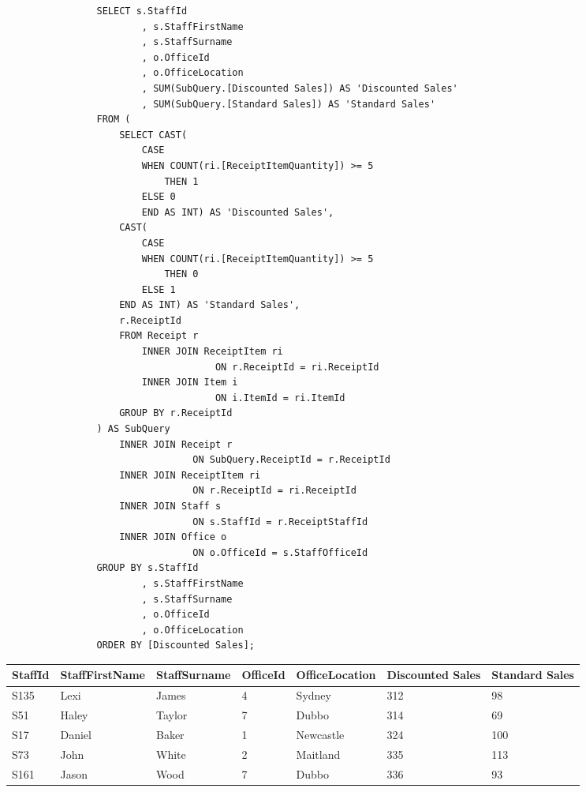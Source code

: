 \documentclass{article}
\begin{document}
            \begin{lstlisting}
				SELECT s.StaffId
						, s.StaffFirstName
						, s.StaffSurname
						, o.OfficeId
						, o.OfficeLocation
						, SUM(SubQuery.[Discounted Sales]) AS 'Discounted Sales'
						, SUM(SubQuery.[Standard Sales]) AS 'Standard Sales'
				FROM (
					SELECT CAST(
						CASE
						WHEN COUNT(ri.[ReceiptItemQuantity]) >= 5
							THEN 1
						ELSE 0
						END AS INT) AS 'Discounted Sales',
					CAST(
						CASE
						WHEN COUNT(ri.[ReceiptItemQuantity]) >= 5
							THEN 0
						ELSE 1
					END AS INT) AS 'Standard Sales',
					r.ReceiptId
					FROM Receipt r
						INNER JOIN ReceiptItem ri
									 ON r.ReceiptId = ri.ReceiptId
						INNER JOIN Item i
									 ON i.ItemId = ri.ItemId
					GROUP BY r.ReceiptId
				) AS SubQuery
					INNER JOIN Receipt r
								 ON SubQuery.ReceiptId = r.ReceiptId
					INNER JOIN ReceiptItem ri
								 ON r.ReceiptId = ri.ReceiptId
					INNER JOIN Staff s
								 ON s.StaffId = r.ReceiptStaffId
					INNER JOIN Office o
								 ON o.OfficeId = s.StaffOfficeId
				GROUP BY s.StaffId
						, s.StaffFirstName
						, s.StaffSurname
						, o.OfficeId
						, o.OfficeLocation
				ORDER BY [Discounted Sales];
            \end{lstlisting}

            \begin{table}[H]
                \centering
                \begin{tabular}{|l|l|l|l|l|l|l|}
                \hline
                StaffId & StaffFirstName & StaffSurname & OfficeId & OfficeLocation & Discounted Sales & Standard Sales \\ \hline
                S135    & Lexi           & James        & 4        & Sydney         & 312              & 98             \\ \hline
                S51     & Haley          & Taylor       & 7        & Dubbo          & 314              & 69             \\ \hline
                S17     & Daniel         & Baker        & 1        & Newcastle      & 324              & 100            \\ \hline
                S73     & John           & White        & 2        & Maitland       & 335              & 113            \\ \hline
                S161    & Jason          & Wood         & 7        & Dubbo          & 336              & 93             \\ \hline
                \end{tabular}
                \end{table}
\end{document}
